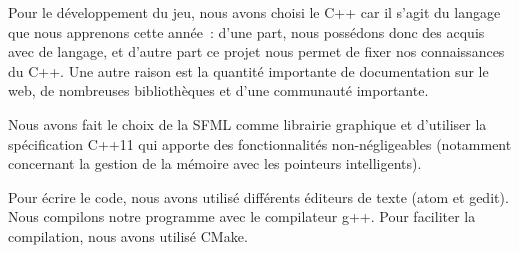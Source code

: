 Pour le développement du jeu, nous avons choisi le C++ car il s'agit du
langage que nous apprenons cette année~: d'une part, nous possédons
donc des acquis avec de langage, et d'autre part ce projet nous permet
de fixer nos connaissances du C++. Une autre raison est la quantité
importante de documentation sur le web, de nombreuses bibliothèques
et d'une communauté importante.

Nous avons fait le choix de la SFML comme librairie graphique et d'utiliser
la spécification C++11 qui apporte des fonctionnalités non-négligeables
(notamment concernant la gestion de la mémoire avec les pointeurs intelligents).
\cite{organisation-smartptr}

Pour écrire le code, nous avons utilisé différents éditeurs de texte
(atom et gedit). Nous compilons notre programme avec le compilateur g++.
Pour faciliter la compilation, nous avons utilisé CMake.
